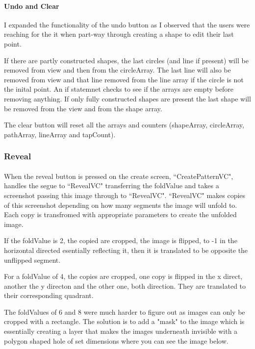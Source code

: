 \documentclass[11pt]{article}
\begin{document}
            
             \paragraph{Undo and Clear}
              I expanded the functionality of the undo button as I observed that the users were reaching for the it when part-way through creating a shape to edit their last point. 
              
              If there are partly constructed shapes, the last circles (and line if present) will be removed from view and then from the circleArray. The last line will also be removed from view and that line removed from the line array if the circle is not the inital point. An if statemnet checks to see if the arrays are empty before removing anything.
              If only fully constructed shapes are present the last shape will be removed from the view and from the shape array. 
              
              The clear button will reset all the arrays and counters (shapeArray, circleArray, pathArray, lineArray and tapCount).
    

    \subsubsection{Reveal}
            \paragraph{}
            When the reveal button is pressed on the create screen, ``CreatePatternVC", handles the segue to ``RevealVC" transferring the foldValue and takes a screenshot passing this image through to ``RevealVC". ``RevealVC" makes copies of this screenshot depending on how many segments the image will unfold to. Each copy is transfromed with appropriate parameters to create the unfolded image. 
            
            If the foldValue is 2, the copied are cropped, the image is flipped, to -1 in the horizontal directed esentially reflecting it, then it is translated to be opposite the unflipped segment. 
            
            For a foldValue of 4, the copies are cropped, one copy is flipped in the x direct, another the y directon and the other one, both direction. They are translated to their corresponding quadrant. 
            
            The foldValues of 6 and 8 were much harder to figure out as images can only be cropped with a rectangle. The solution is to add a "mask" to the image which is essentially creating a layer that makes the images underneath invisible with a polygon shaped hole of set dimensions where you can see the image below. 
            
\end{document}
